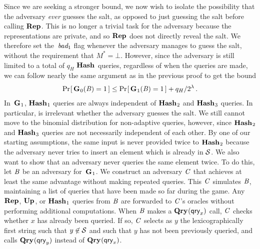 Since we are seeking a stronger bound, we now wish to isolate the possibility
that the adversary \emph{ever} guesses the salt, as opposed to just guessing the
salt before calling $\textup{\textbf{Rep}}\hspace{0.5pt}$. This is no longer a trivial task for the adversary
because the representations are private, and so $\textup{\textbf{Rep}}\hspace{0.5pt}$ does not directly reveal
the salt. We therefore set the~$\textit{bad}_1$ flag whenever the adversary manages to
guess the salt, without the requirement that $M^* = \bot$. However, since the
adversary is still limited to a total of $q_H$ $\textup{\textbf{Hash}}\hspace{0.5pt}$ queries, regardless of
when the queries are made, we can follow nearly the same argument as in the
previous proof to get the bound
%
\begin{eqnarray}
  \Pr\hspace{-1pt}\left[\,\textup{\textbf{G}}\hspace{0.5pt}_0(\mathit{B})=1\,\right] \leq
    \Pr\hspace{-1pt}\left[\,\textup{\textbf{G}}\hspace{0.5pt}_1(\mathit{B})=1\,\right] + q_H/2^\lambda \,.
\end{eqnarray}
%
In~$\textup{\textbf{G}}\hspace{0.5pt}_1$, $\textup{\textbf{Hash}}\hspace{0.5pt}_1$ queries are always independent of $\textup{\textbf{Hash}}\hspace{0.5pt}_2$ and
$\textup{\textbf{Hash}}\hspace{0.5pt}_3$ queries. In particular, is irrelevant whether the adversary guesses
the salt.
%
We still cannot move to the binomial distribution for non-adaptive queries,
however, since $\textup{\textbf{Hash}}\hspace{0.5pt}_2$ and $\textup{\textbf{Hash}}\hspace{0.5pt}_3$ queries are not necessarily independent
of each other. By one of our starting assumptions, the same input is never
provided twice to $\textup{\textbf{Hash}}\hspace{0.5pt}_2$ because the adversary never tries to insert an
element which is already in $\mathcal{S}$. We also want to show that an adversary never
queries the same element twice. To do this, let $\mathit{B}$ be an adversary
for~$\textup{\textbf{G}}\hspace{0.5pt}_1$. We construct an adversary $\mathit{C}$ that achieves at least the same
advantage without making repeated queries. This $\mathit{C}$ simulates $\mathit{B}$,
maintaining a list of queries that have been made so far during the
game. Any $\textup{\textbf{Rep}}\hspace{0.5pt}$, $\textup{\textbf{Up}}\hspace{0.5pt}$, or $\textup{\textbf{Hash}}\hspace{0.5pt}_1$ queries from $\mathit{B}$ are forwarded to $\mathit{C}$'s
oracles without performing additional computations. When $\mathit{B}$ makes a
$\textup{\textbf{Qry}}\hspace{0.5pt}(\mathsf{qry}_x)$ call, $\mathit{C}$ checks whether $x$ has already been queried. If
so, $\mathit{C}$ selects as $y$ the lexicographically first string such that
$y \not\in \mathcal{S}$ and such that $y$ has not been previously
queried, and calls $\textup{\textbf{Qry}}\hspace{0.5pt}(\mathsf{qry}_y)$ instead of $\textup{\textbf{Qry}}\hspace{0.5pt}(\mathsf{qry}_x)$.

